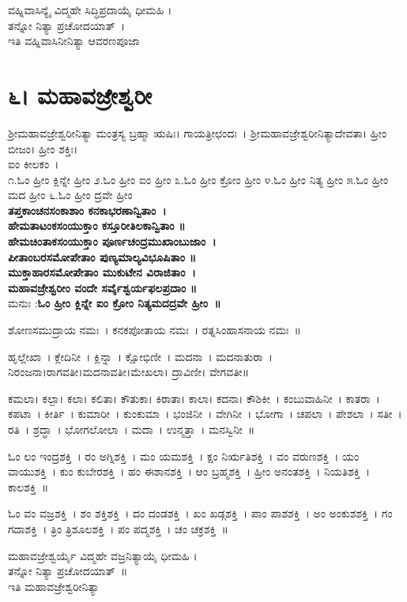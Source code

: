 ವಹ್ನಿವಾಸಿನ್ಯೈ ವಿದ್ಮಹೇ ಸಿದ್ಧಿಪ್ರದಾಯೈ ಧೀಮಹಿ ।\\ತನ್ನೋ ನಿತ್ಯಾ ಪ್ರಚೋದಯಾತ್~।\\
ಇತಿ ವಹ್ನಿವಾಸಿನೀನಿತ್ಯಾ ಆವರಣಪೂಜಾ
\section{೬। ಮಹಾವಜ್ರೇಶ್ವರೀ}
ಶ್ರೀಮಹಾವಜ್ರೇಶ್ವರೀನಿತ್ಯಾ ಮಂತ್ರಸ್ಯ ಬ್ರಹ್ಮಾ ಋಷಿಃ। ಗಾಯತ್ರೀಛಂದಃ~। ಶ್ರೀಮಹಾವಜ್ರೇಶ್ವರೀನಿತ್ಯಾದೇವತಾ। ಹ್ರೀಂ ಬೀಜಂ। ಹ್ರೀಂ ಶಕ್ತಿಃ।\\
ಐಂ ಕೀಲಕಂ~।\\
೧.ಓಂ ಹ್ರೀಂ ಕ್ಲಿನ್ನೇ ಹ್ರೀಂ  ೨.ಓಂ ಹ್ರೀಂ ಐಂ ಹ್ರೀಂ  ೩.ಓಂ ಹ್ರೀಂ ಕ್ರೋಂ ಹ್ರೀಂ ೪.ಓಂ ಹ್ರೀಂ ನಿತ್ಯ ಹ್ರೀಂ  ೫.ಓಂ ಹ್ರೀಂ ಮದ ಹ್ರೀಂ ೬.ಓಂ ಹ್ರೀಂ ದ್ರವೇ ಹ್ರೀಂ \\
{\bfseries ತಪ್ತಕಾಂಚನಸಂಕಾಶಾಂ ಕನಕಾಭರಣಾನ್ವಿತಾಂ~।\\
ಹೇಮತಾಟಂಕಸಂಯುಕ್ತಾಂ ಕಸ್ತೂರೀತಿಲಕಾನ್ವಿತಾಂ ॥\\
ಹೇಮಚಿಂತಾಕಸಂಯುಕ್ತಾಂ ಪೂರ್ಣಚಂದ್ರಮುಖಾಂಬುಜಾಂ~।\\
ಪೀತಾಂಬರಸಮೋಪೇತಾಂ ಪುಣ್ಯಮಾಲ್ಯವಿಭೂಷಿತಾಂ ॥\\
ಮುಕ್ತಾಹಾರಸಮೋಪೇತಾಂ ಮುಕುಟೇನ ವಿರಾಜಿತಾಂ~।\\
ಮಹಾವಜ್ರೇಶ್ವರೀಂ ವಂದೇ ಸರ್ವೈಶ್ವರ್ಯಫಲಪ್ರದಾಂ ॥\\}
ಮನುಃ :{\bfseries  ಓಂ ಹ್ರೀಂ ಕ್ಲಿನ್ನೇ ಐಂ ಕ್ರೋಂ ನಿತ್ಯಮದದ್ರವೇ ಹ್ರೀಂ~॥}

ಶೋಣಸಮುದ್ರಾಯ ನಮಃ~। ಕನಕಪೋತಾಯ ನಮಃ~। ರತ್ನಸಿಂಹಾಸನಾಯ ನಮಃ~॥

ಹೃಲ್ಲೇಖಾ~। ಕ್ಲೇದಿನೀ~। ಕ್ಲಿನ್ನಾ~। ಕ್ಷೋಭಿಣೀ~। ಮದನಾ~। ಮದನಾತುರಾ~। \\ನಿರಂಜನಾ।ರಾಗವತೀ।ಮದನಾವತೀ।ಮೇಖಲಾ। ದ್ರಾವಿಣೀ। ವೇಗವತೀ॥ 

ಕಮಲಾ। ಕಲ್ಪಾ। ಕಲಾ। ಕಲಿತಾ। ಕೌತುಕಾ। ಕಿರಾತಾ। ಕಾಲಾ। ಕದನಾ। ಕೌಶಿಕೀ~। ಕಂಬುವಾಹಿನೀ~। ಕಾತರಾ~। ಕಪಟಾ~। ಕೀರ್ತಿ~। ಕುಮಾರೀ~। ಕುಂಕುಮಾ~। ಭಂಜಿನೀ~। ವೇಗಿನೀ~। ಭೋಗಾ~। ಚಪಲಾ~। ಪೇಶಲಾ~। ಸತೀ~। ರತಿ~। ಶ್ರದ್ಧಾ~। ಭೋಗಲೋಲಾ~। ಮದಾ~। ಉನ್ಮತ್ತಾ~। ಮನಸ್ವಿನೀ~॥ 

ಓಂ ಲಂ ಇಂದ್ರಶಕ್ತಿ~।  ರಂ ಅಗ್ನಿಶಕ್ತಿ~।  ಮಂ ಯಮಶಕ್ತಿ~।  ಕ್ಷಂ ನಿರ್ಋತಿಶಕ್ತಿ~।  ವಂ ವರುಣಶಕ್ತಿ~।  ಯಂ ವಾಯುಶಕ್ತಿ~।  ಕುಂ ಕುಬೇರಶಕ್ತಿ~।  ಹಂ ಈಶಾನಶಕ್ತಿ~।  ಆಂ ಬ್ರಹ್ಮಶಕ್ತಿ~।  ಹ್ರೀಂ ಅನಂತಶಕ್ತಿ~।  ನಿಯತಿಶಕ್ತಿ~।  ಕಾಲಶಕ್ತಿ~॥

ಓಂ ವಂ ವಜ್ರಶಕ್ತಿ~।  ಶಂ ಶಕ್ತಿಶಕ್ತಿ~।  ದಂ ದಂಡಶಕ್ತಿ~।  ಖಂ ಖಡ್ಗಶಕ್ತಿ~।  ಪಾಂ ಪಾಶಶಕ್ತಿ~।  ಅಂ ಅಂಕುಶಶಕ್ತಿ~।  ಗಂ ಗದಾಶಕ್ತಿ~।  ತ್ರಿಂ ತ್ರಿಶೂಲಶಕ್ತಿ~।  ಪಂ ಪದ್ಮಶಕ್ತಿ~।  ಚಂ ಚಕ್ರಶಕ್ತಿ~॥

ಮಹಾವಜ್ರೇಶ್ವರ್ಯೈ ವಿದ್ಮಹೇ ವಜ್ರನಿತ್ಯಾಯೈ ಧೀಮಹಿ ।\\ತನ್ನೋ ನಿತ್ಯಾ ಪ್ರಚೋದಯಾತ್~॥\\
ಇತಿ ಮಹಾವಜ್ರೇಶ್ವರೀನಿತ್ಯಾ
